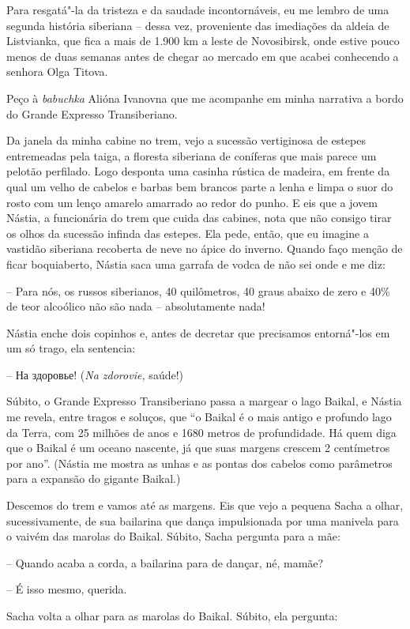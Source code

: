Para resgatá"-la da tristeza e da saudade incontornáveis, eu me lembro de
uma segunda história siberiana -- dessa vez, proveniente das imediações
da aldeia de Listvianka, que fica a mais de 1.900 km a leste de
Novosibirsk, onde estive pouco menos de duas semanas antes de chegar ao
mercado em que acabei conhecendo a senhora Olga Titova.

Peço à \emph{babuchka} Alióna Ivanovna que me acompanhe em minha
narrativa a bordo do Grande Expresso Transiberiano.

Da janela da minha cabine no trem, vejo a sucessão vertiginosa de
estepes entremeadas pela taiga, a floresta siberiana de coníferas que
mais parece um pelotão perfilado. Logo desponta uma casinha rústica de
madeira, em frente da qual um velho de cabelos e barbas bem brancos
parte a lenha e limpa o suor do rosto com um lenço amarelo amarrado ao
redor do punho. E eis que a jovem Nástia, a funcionária do trem que
cuida das cabines, nota que não consigo tirar os olhos da sucessão
infinda das estepes. Ela pede, então, que eu imagine a vastidão
siberiana recoberta de neve no ápice do inverno. Quando faço menção de
ficar boquiaberto, Nástia saca uma garrafa de vodca de não sei onde e me
diz:

-- Para nós, os russos siberianos, 40 quilômetros, 40 graus abaixo de
zero e 40\% de teor alcoólico não são nada -- absolutamente nada!

Nástia enche dois copinhos e, antes de decretar que precisamos
entorná"-los em um só trago, ela sentencia:

-- На здоровье! (\emph{Na zdorovie,} saúde!)

Súbito, o Grande Expresso Transiberiano passa a margear o lago Baikal, e
Nástia me revela, entre tragos e soluços, que ``o Baikal é o mais antigo
e profundo lago da Terra, com 25 milhões de anos e 1680 metros de
profundidade. Há quem diga que o Baikal é um oceano nascente, já que
suas margens crescem 2 centímetros por ano''. (Nástia me mostra as unhas
e as pontas dos cabelos como parâmetros para a expansão do gigante
Baikal.)

Descemos do trem e vamos até as margens. Eis que vejo a pequena Sacha a
olhar, sucessivamente, de sua bailarina que dança impulsionada por uma
manivela para o vaivém das marolas do Baikal. Súbito, Sacha pergunta
para a mãe:

-- Quando acaba a corda, a bailarina para de dançar, né, mamãe?

-- É isso mesmo, querida.

Sacha volta a olhar para as marolas do Baikal. Súbito, ela pergunta:

